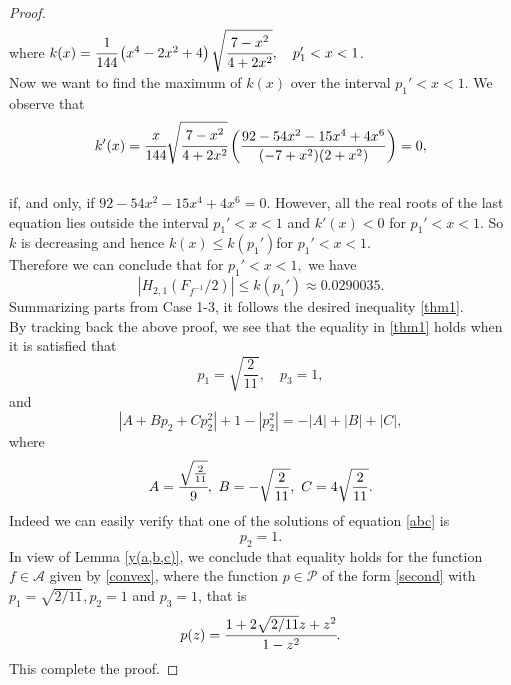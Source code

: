 \documentclass[10pt,a4paper]{amsart}
\begin{document}
\begin{proof}
\begin{equation}
\begin{aligned}
\end{aligned}
\end{equation}
where $k(x)=\cfrac{1}{144}\left(x^4-2x^2+4\right)\sqrt{\cfrac{7-x^2}{4+2x^2}}, \quad p_1'<x<1$.\\[2mm]
Now we want to find the maximum of $k(x)$ over the interval $p_1'<x<1$. We observe that
$$
k'(x)=\cfrac{x}{144}  \sqrt{\cfrac{7 - x^2}{
 4 + 2 x^2}}\left( \frac{92 - 54x^2 - 15 x^4 + 4 x^6}{(-7 + x^2) (2 +
    x^2)}\right)=0,
$$\\[1mm]
    if, and only, if $92 - 54x^2 - 15 x^4 + 4 x^6=0$. However, all the real roots of the last equation lies outside the interval $p_1'<x<1$ and $k'(x)<0$ for $p_1'<x<1$. So $k$ is decreasing and hence $k(x)\leq k(p_1')$for $p_1'<x<1$.\\[1mm]
Therefore we can conclude that for $p_1'<x<1,$
we have
$$
 |H_{2,1}(F_{f^{-1}}/2)|\leq k(p_1') \approx 0.0290035.
$$
Summarizing parts from Case 1-3, it follows the desired inequality \eqref{thm1}.\\
By tracking back the above proof, we see that the equality in \eqref{thm1} holds when it is satisfied that 
\begin{equation}
p_1=\sqrt{\frac{2}{11}},\quad p_3=1,
\end{equation}
and
\begin{equation}\label{abc}
|A+Bp_2+Cp_2^2|+1-|p_2^2|=-|A|+|B|+|C|,
\end{equation}
where
$$
A=\cfrac{\sqrt{\frac{2}{11}}}{9},\,\, B=-\sqrt{\frac{2}{11}},\,\,C=4\sqrt{\frac{2}{11}}.
$$
Indeed we can easily verify that one of the solutions of equation \eqref{abc} is
$$
p_2=1.
$$
In view of Lemma \ref{y(a,b,c)}, we conclude that equality holds for the function $f\in \mathcal{A}$ given by \eqref{convex}, where the function $p \in \mathcal{P}$ of the form \eqref{second} with $p_1=\sqrt{2/11},p_2=1$ and $p_3=1$, that is 
$$
p(z)=\cfrac{1+2\sqrt{2/11}z+z^2}{1-z^2}.
$$
This complete the proof.
\end{proof}
\end{document}
